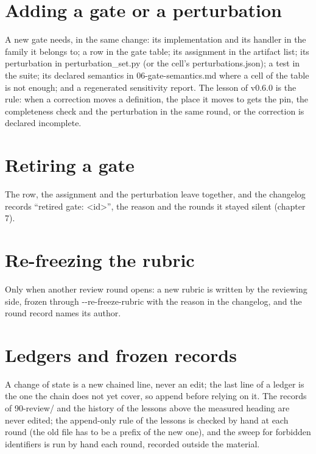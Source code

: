 \documentclass[
  american,
  10pt,
]{report}
\renewcommand{\texttt}[1]{{\ttfamily\hyphenchar\font=-1 #1}}
\begin{document}
\section{Adding a gate or a
perturbation}\label{adding-a-gate-or-a-perturbation}

A new gate needs, in the same change: its implementation and its handler
in the family it belongs to; a row in the gate table; its assignment in
the artifact list; its perturbation in
\texttt{perturbation\_\allowbreak{}set.\allowbreak{}py} (or the cell's
\texttt{perturbations.\allowbreak{}json}); a test in the suite; its
declared semantics in
\texttt{06-\allowbreak{}gate-\allowbreak{}semantics.\allowbreak{}md}
where a cell of the table is not enough; and a regenerated sensitivity
report. The lesson of v0.6.0 is the rule: when a correction moves a
definition, the place it moves to gets the pin, the completeness check
and the perturbation in the same round, or the correction is declared
incomplete.

\section{Retiring a gate}\label{retiring-a-gate}

The row, the assignment and the perturbation leave together, and the
changelog records ``retired gate: \texttt{<id>}'', the reason and the
rounds it stayed silent (chapter 7).

\section{Re-freezing the rubric}\label{re-freezing-the-rubric}

Only when another review round opens: a new rubric is written by the
reviewing side, frozen through
\texttt{-\allowbreak{}-\allowbreak{}re-\allowbreak{}freeze-\allowbreak{}rubric}
with the reason in the changelog, and the round record names its author.

\section{Ledgers and frozen records}\label{ledgers-and-frozen-records}

A change of state is a new chained line, never an edit; the last line of
a ledger is the one the chain does not yet cover, so append before
relying on it. The records of
\texttt{90-\allowbreak{}review/\allowbreak{}} and the history of the
lessons above the measured heading are never edited; the append-only
rule of the lessons is checked by hand at each round (the old file has
to be a prefix of the new one), and the sweep for forbidden identifiers
is run by hand each round, recorded outside the material.
\end{document}
